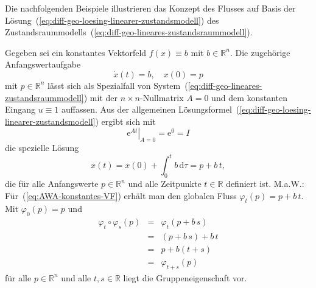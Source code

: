 Die nachfolgenden Beispiele illustrieren das Konzept des Flusses auf
Basis der Lösung~(\ref{eq:diff-geo-loesing-linearer-zustandsmodell})
des Zustandsraummodells~(\ref{eq:diff-geo-lineares-zustandsraummodell}).
\begin{example}
\label{exa:konstantes-Vektorfeld-Gruppeneig}Gegeben
sei ein konstantes Vektorfeld $f(x)\equiv b$ mit $b\in{\mathbb{R}}^{n}$. Die
zugehörige Anfangswertaufgabe
\begin{equation}
\dot{x}(t)=b,\quad x(0)=p\label{eq:AWA-konstantes-VF}
\end{equation}
mit $p\in{\mathbb{R}}^{n}$ lässt sich als Spezialfall von System~(\ref{eq:diff-geo-lineares-zustandsraummodell})
mit der $n\times n$-Nullmatrix $A=0$ und dem konstanten Eingang
$u\equiv1$ auffassen. Aus der allgemeinen Lösungsformel~(\ref{eq:diff-geo-loesing-linearer-zustandsmodell})
ergibt sich mit
\begin{equation}
\left.{\mathrm{e}}^{At}\right|_{A=0}={\mathrm{e}}^{0}=I\label{eq:exp-hoch-null}
\end{equation}
die spezielle Lösung
\[
x(t)=x(0)+\int_{0}^{t}b\,{\mathrm{d}}\tau=p+b\,t,
\]
die für alle Anfangswerte $p\in{\mathbb{R}}^{n}$ und alle Zeitpunkte $t\in{\mathbb{R}}$
definiert ist. M.a.W.: Für~(\ref{eq:AWA-konstantes-VF}) erhält man
den globalen Fluss $\varphi_{t}(p)=p+b\,t$. Mit $\varphi_{0}(p)=p$
und
\begin{eqnarray*}
\varphi_{t}\circ\varphi_{s}(p) & = & \varphi_{t}(p+b\,s)\\
 & = & (p+b\,s)+b\,t\\
 & = & p+b(t+s)\\
 & = & \varphi_{t+s}(p)
\end{eqnarray*}
für alle $p\in{\mathbb{R}}^{n}$ und alle $t,s\in{\mathbb{R}}$ liegt die Gruppeneigenschaft
vor.
\end{example}

